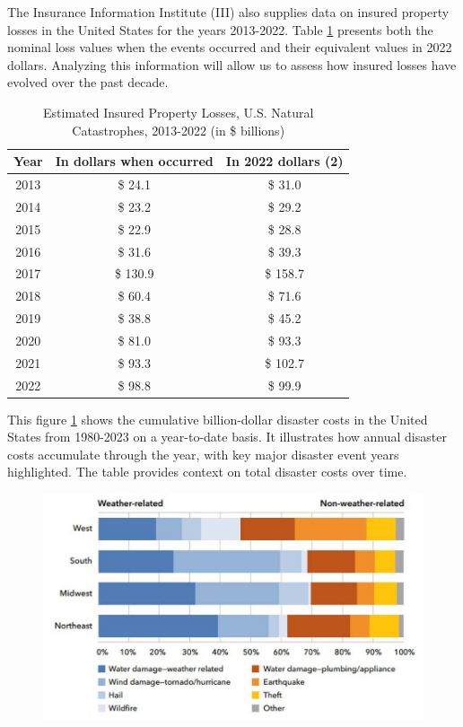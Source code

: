 \documentclass[12pt]{article}
\begin{document}
The Insurance Information Institute (III) \cite{iii} also supplies data on insured property losses in the United States for the years 
2013-2022. Table \ref{tab:insured_prop_losses} presents both the nominal loss values when the events occurred and their equivalent 
values in 2022 dollars. Analyzing this information will allow us to assess how insured losses have evolved over the past decade.


\begin{table}[h]
    \caption{Estimated Insured Property Losses, U.S. Natural Catastrophes, 2013-2022 (in \$ billions)}
    \label{tab:insured_prop_losses}
    \centering
    \begin{tabular}{|c|c|c|}
        \hline
        Year & In dollars when occurred & In 2022 dollars (2) \\
        \hline
        2013 & \$ 24.1 & \$ 31.0 \\
        2014 & \$ 23.2 & \$ 29.2 \\
        2015 & \$ 22.9 & \$ 28.8 \\
        2016 & \$ 31.6 & \$ 39.3 \\
        2017 & \$ 130.9 & \$ 158.7 \\
        2018 & \$ 60.4 & \$ 71.6 \\
        2019 & \$ 38.8 & \$ 45.2 \\
        2020 & \$ 81.0 & \$ 93.3 \\
        2021 & \$ 93.3 & \$ 102.7 \\
        2022 & \$ 98.8 & \$ 99.9 \\
        \hline
    \end{tabular}
    \cite{iii}
\end{table}    
  

This figure \ref{fig:disaster_threats} shows the cumulative billion-dollar disaster costs in the United States from 1980-2023 on a year-to-date basis. It 
illustrates how annual disaster costs accumulate through the year, with key major disaster event years highlighted. The table 
provides context on total disaster costs over time.

\begin{figure}[ht]
    \centering
    \label{fig:disaster_threats}
    \includegraphics[width=0.8\linewidth]{NAIC HO threats.pdf}
    \cite{naic}
\end{figure}
\end{document}
